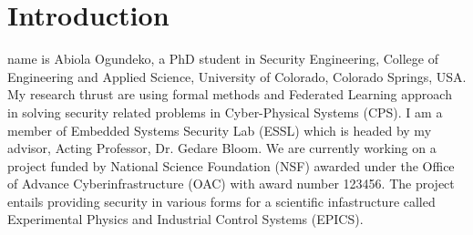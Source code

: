 \section{Introduction}
% 
% 
% 
% 
 name is Abiola Ogundeko, a PhD student in Security Engineering, College of Engineering and Applied Science, University of Colorado, Colorado Springs, USA. My research thrust are using formal methods and Federated Learning approach in solving security related problems in Cyber-Physical Systems (CPS). I am a member of Embedded Systems Security Lab (ESSL) which is headed by my advisor, Acting Professor, Dr. Gedare Bloom. We are currently working on a project funded by National Science Foundation (NSF) awarded under the Office of Advance Cyberinfrastructure (OAC) with award number 123456. The project entails providing security in various forms for a scientific infastructure called Experimental Physics and Industrial Control Systems (EPICS). 

 

